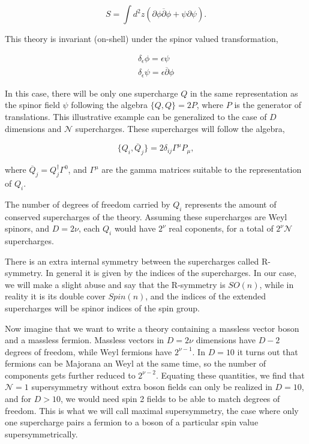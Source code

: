 \begin{equation}
    S = \int d^2 z \left( \partial \phi \overline{\partial}\phi + \psi \partial \psi \right).
\end{equation}

This theory is invariant (on-shell) under the spinor valued transformation,

\begin{equation}
    \begin{aligned}
        \delta_\epsilon \phi = \epsilon \psi\\
        \delta_\epsilon \psi =  \epsilon \overline{\partial} \phi
    \end{aligned}
\end{equation}

In this case, there will be only one supercharge $Q$ in the same representation as the spinor field $\psi$ following the algebra $\{ Q, Q\} = 2P$, where $P$ is the generator of translations. This illustrative example can be generalized to the case of $D$ dimensions and $\mathcal{N}$ supercharges. These supercharges will follow the algebra,

\begin{equation}
    \{ Q_i, \overline{Q}_j \} = 2 \delta_{ij} \Gamma^\mu P_\mu,
\end{equation}

where $\overline{Q}_j = Q^\dagger_j \Gamma^0$, and $\Gamma^\mu$ are the gamma matrices suitable to the representation of $Q_i$.

The number of degrees of freedom carried by $Q_i$ represents the amount of conserved supercharges of the theory. Assuming these supercharges are Weyl spinors, and $D = 2\nu$, each $Q_i$ would have $2^\nu$ real coponents, for a total of $2^\nu \mathcal{N}$ supercharges.

There is an extra internal symmetry between the supercharges called R-symmetry. In general it is given by the indices of the supercharges. In our case, we will make a slight abuse and say that the R-symmetry is $SO(n)$, while in reality it is its double cover $Spin(n)$, and the indices of the extended supercharges will be spinor indices of the spin group.

Now imagine that we want to write a theory containing a massless vector boson and a massless fermion. Massless vectors in $D = 2 \nu$ dimensions have $D-2$ degrees of freedom, while Weyl fermions have $2^{\nu-1}$. In $D = 10$ it turns out that fermions can be Majorana an Weyl at the same time, so the number of components gets further reduced to $2^{\nu-2}$. Equating these quantities, we find that $\mathcal{N} = 1$ supersymmetry without extra boson fields can only be realized in $D = 10$, and for $D > 10$, we would need spin 2 fields to be able to match degrees of freedom. This is what we will call maximal supersymmetry, the case where only one supercharge pairs a fermion to a boson of a particular spin value supersymmetrically.

